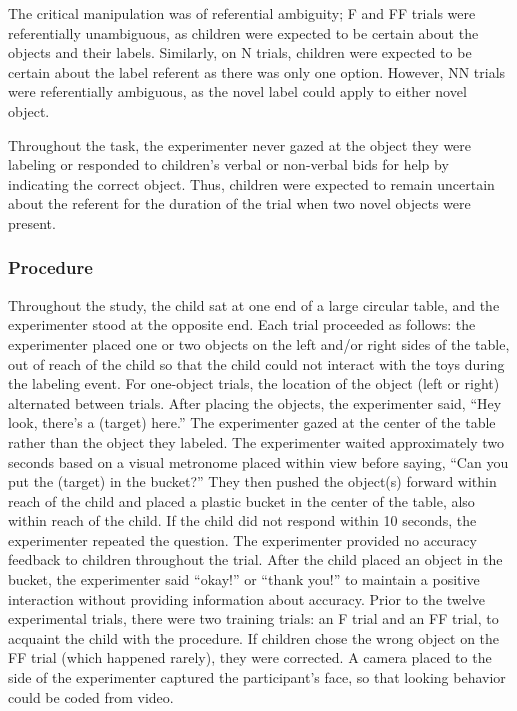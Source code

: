 \documentclass[english,,man]{apa6}
\begin{document}
The critical manipulation was of referential ambiguity; F and FF trials
were referentially unambiguous, as children were expected to be certain
about the objects and their labels. Similarly, on N trials, children
were expected to be certain about the label referent as there was only
one option. However, NN trials were referentially ambiguous, as the
novel label could apply to either novel object.

Throughout the task, the experimenter never gazed at the object they
were labeling or responded to children's verbal or non-verbal bids for
help by indicating the correct object. Thus, children were expected to
remain uncertain about the referent for the duration of the trial when
two novel objects were present.

\subsubsection{Procedure}\label{procedure}

Throughout the study, the child sat at one end of a large circular
table, and the experimenter stood at the opposite end. Each trial
proceeded as follows: the experimenter placed one or two objects on the
left and/or right sides of the table, out of reach of the child so that
the child could not interact with the toys during the labeling event.
For one-object trials, the location of the object (left or right)
alternated between trials. After placing the objects, the experimenter
said, \enquote{Hey look, there's a (target) here.} The experimenter
gazed at the center of the table rather than the object they labeled.
The experimenter waited approximately two seconds based on a visual
metronome placed within view before saying, \enquote{Can you put the
(target) in the bucket?} They then pushed the object(s) forward within
reach of the child and placed a plastic bucket in the center of the
table, also within reach of the child. If the child did not respond
within 10 seconds, the experimenter repeated the question. The
experimenter provided no accuracy feedback to children throughout the
trial. After the child placed an object in the bucket, the experimenter
said \enquote{okay!} or \enquote{thank you!} to maintain a positive
interaction without providing information about accuracy. Prior to the
twelve experimental trials, there were two training trials: an F trial
and an FF trial, to acquaint the child with the procedure. If children
chose the wrong object on the FF trial (which happened rarely), they
were corrected. A camera placed to the side of the experimenter captured
the participant's face, so that looking behavior could be coded from
video.
\end{document}
